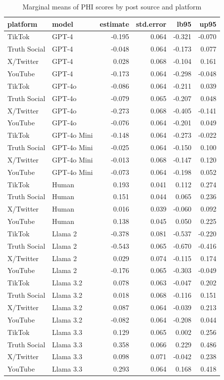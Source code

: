 \begin{table}

\caption{Marginal means of PHI scores by post source and platform}
\centering
\begin{tabular}[t]{llrrrr}
\toprule
platform & model & estimate & std.error & lb95 & up95\\
\midrule
TikTok & GPT-4 & -0.195 & 0.064 & -0.321 & -0.070\\
Truth Social & GPT-4 & -0.048 & 0.064 & -0.173 & 0.077\\
X/Twitter & GPT-4 & 0.028 & 0.068 & -0.104 & 0.161\\
YouTube & GPT-4 & -0.173 & 0.064 & -0.298 & -0.048\\
TikTok & GPT-4o & -0.086 & 0.064 & -0.211 & 0.039\\
\addlinespace
Truth Social & GPT-4o & -0.079 & 0.065 & -0.207 & 0.048\\
X/Twitter & GPT-4o & -0.273 & 0.068 & -0.405 & -0.141\\
YouTube & GPT-4o & -0.076 & 0.064 & -0.201 & 0.049\\
TikTok & GPT-4o Mini & -0.148 & 0.064 & -0.273 & -0.022\\
Truth Social & GPT-4o Mini & -0.025 & 0.064 & -0.150 & 0.100\\
\addlinespace
X/Twitter & GPT-4o Mini & -0.013 & 0.068 & -0.147 & 0.120\\
YouTube & GPT-4o Mini & -0.073 & 0.064 & -0.198 & 0.052\\
TikTok & Human & 0.193 & 0.041 & 0.112 & 0.274\\
Truth Social & Human & 0.151 & 0.044 & 0.065 & 0.236\\
X/Twitter & Human & 0.016 & 0.039 & -0.060 & 0.092\\
\addlinespace
YouTube & Human & 0.138 & 0.045 & 0.050 & 0.225\\
TikTok & Llama 2 & -0.378 & 0.081 & -0.537 & -0.220\\
Truth Social & Llama 2 & -0.543 & 0.065 & -0.670 & -0.416\\
X/Twitter & Llama 2 & 0.029 & 0.074 & -0.115 & 0.174\\
YouTube & Llama 2 & -0.176 & 0.065 & -0.303 & -0.049\\
\addlinespace
TikTok & Llama 3.2 & 0.078 & 0.063 & -0.047 & 0.202\\
Truth Social & Llama 3.2 & 0.018 & 0.068 & -0.116 & 0.151\\
X/Twitter & Llama 3.2 & 0.087 & 0.064 & -0.039 & 0.213\\
YouTube & Llama 3.2 & -0.082 & 0.064 & -0.208 & 0.044\\
TikTok & Llama 3.3 & 0.129 & 0.065 & 0.002 & 0.256\\
\addlinespace
Truth Social & Llama 3.3 & 0.358 & 0.066 & 0.229 & 0.486\\
X/Twitter & Llama 3.3 & 0.098 & 0.071 & -0.042 & 0.238\\
YouTube & Llama 3.3 & 0.293 & 0.064 & 0.168 & 0.418\\
\bottomrule
\end{tabular}
\end{table}
